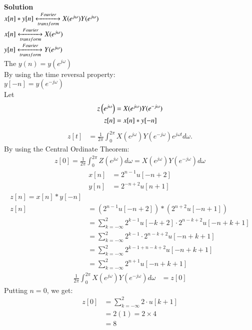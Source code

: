 \documentclass[journal,12pt,twocolumn]{IEEEtran}
\theoremstyle{remark}
\begin{document}
\textbf{Solution}\\
 $x[n]*y[n] \xleftrightarrow[transform]{Fourier} X(e^{j\omega}) Y(e^{j\omega})$\\
 $x[n] \xleftrightarrow[transform]{Fourier} X(e^{j\omega}) $\\
 $y[n] \xleftrightarrow[transform]{Fourier} Y(e^{j\omega}) $\\
 The $y(n) = y(e^{j\omega})$\\
By using the time reversal property:\\
$y[-n] = y(e^{-j\omega})$\\
Let
\begin{align}
     z\left(e^{j \omega}\right) &=X(e^{j\omega}) Y(e^{-j\omega})\\
 z[n]& = x[n] * y[-n]
 \end{align}
 \begin{align}
      z[t]& =\frac{1}{2\pi} \int_{0}^{2\pi}  X(e^{j\omega}) Y(e^{-j\omega})e^{j \omega t} d\omega.
 \end{align}
By using the Central Ordinate Theorem: 
\begin{align}
    z[0] =\frac{1}{2\pi} \int_{0}^{2\pi} Z(e^{j\omega}) d\omega = X(e^{j\omega}) Y(e^{-j\omega}) d\omega
\end{align}
\begin{align}
     x[n]& = 2^{n-1} u[-n+2]\\
     y[n]&=2^{-n+2}u[n+1]
\end{align}
\begin{align}
    z[n] = x[n] * y[-n]\\
    z[n] &= (2^{n-1} u[-n+2]) * (2^{n+2}u[-n+1])\\
 &= \sum_{k=-\infty}^{2} 2^{k-1} u[-k+2]\cdot 2^{n-k+2} u[-n+k+1]\\
 &= \sum_{k=-\infty}^{2} 2^{k-1} \cdot 2^{n-k+2} u[-n+k+1]\\
 &= \sum_{k=-\infty}^{2} 2^{k-1+n-k+2} u[-n+k+1]\\
 &= \sum_{k=-\infty}^{2} 2^{n+1} u[-n+k+1]
\end{align}
\begin{align}
\frac{1}{2\pi} \int_{0}^{2\pi} X(e^{j\omega}) Y(e^{-j\omega}) d\omega&=z[0]
\end{align}
Putting $n = 0$, we get:
\begin{align}
     z[0] &= \sum_{k=-\infty}^{2} 2 \cdot u[k+1] \\
     &= 2(1) = 2 \times 4 \\
     &= 8
\end{align}
\end{document}
